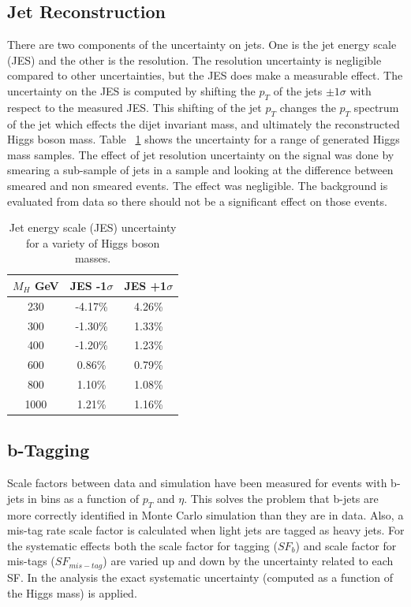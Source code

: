 \subsection{Jet Reconstruction}
\label{JESsystematics}

There are two components of the uncertainty on jets.  One is the jet energy scale (JES) and the other is the resolution.  The resolution uncertainty is negligible compared to other uncertainties, but the JES does make a measurable effect.  The uncertainty on the JES is computed by shifting the $p_T$ of the jets $\pm 1 \sigma$ with respect to the measured JES.  This shifting of the jet $p_T$ changes the $p_T$ spectrum of the jet which effects the dijet invariant mass, and ultimately the reconstructed Higgs boson mass.  Table ~\ref{tab:JES} shows the uncertainty for a range of generated Higgs mass samples. The effect of jet resolution uncertainty on the signal was done by smearing a sub-sample of jets in a sample and looking at the difference between smeared and non smeared events. The effect was negligible.  The background is evaluated from data so there should not be a significant effect on those events.


\begin{table}[htb]
\caption{%
    Jet energy scale (JES) uncertainty for a variety of Higgs boson masses.
}
\begin{center}

    \begin{tabular}{ | c | c | c |}
      \hline
      $M_H$ GeV & JES -1$\sigma$ & JES +1$\sigma$ \\ \hline \hline
      230  & -4.17\% & 4.26\% \\
      300  & -1.30\% & 1.33\% \\
      400  & -1.20\% & 1.23\% \\ 
      600  & 0.86\%  & 0.79\% \\
      800  & 1.10\%  & 1.08\% \\
      1000 & 1.21\%  & 1.16\% \\ \hline
      
    \end{tabular}
\end{center}
\label{tab:JES}
\end{table}




\subsection{b-Tagging}
Scale factors between data and simulation have been measured for events with b-jets in bins as a function of $p_T$ and $\eta$.  This solves the problem that b-jets are more correctly identified in Monte Carlo simulation than they are in data.  Also, a mis-tag rate scale factor is calculated when light jets are tagged as heavy jets.  For the systematic effects both the scale factor for tagging ($SF_b$) and scale factor for mis-tags ($SF_{mis-tag}$) are varied up and down by the uncertainty related to each SF. In the analysis the exact systematic uncertainty (computed as a function of the Higgs mass) is applied.


